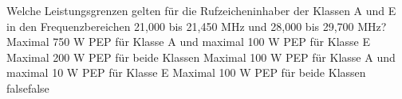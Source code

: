     {Welche Leistungsgrenzen gelten für die Rufzeicheninhaber der Klassen A und E in den Frequenzbereichen 21,000 bis 21,450 MHz und 28,000 bis 29,700 MHz?}
    {Maximal 750 W PEP für Klasse A und maximal 100 W PEP für Klasse E}
    {Maximal 200 W PEP für beide Klassen}
    {Maximal 100 W PEP für Klasse A und maximal 10 W PEP für Klasse E}
    {Maximal 100 W PEP für beide Klassen}
    {false}{false}